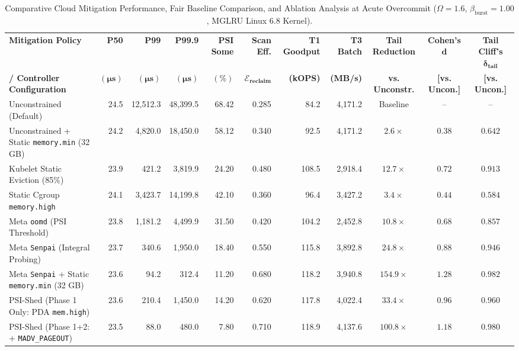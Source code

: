 \begin{table}[t]
\centering
\caption{Comparative Cloud Mitigation Performance, Fair Baseline Comparison, and Ablation Analysis at Acute Overcommit ($\Omega = 1.6$, $\beta_{\text{burst}} = 1.00$, MGLRU Linux 6.8 Kernel).}
\label{tab:mitigation}
\footnotesize
\begin{adjustbox}{width=\textwidth}
\begin{tabular}{lrrrrrrrccc}
\toprule
\textbf{Mitigation Policy} & \textbf{P50} & \textbf{P99} & \textbf{P99.9} & \textbf{PSI Some} & \textbf{Scan Eff.} & \textbf{T1 Goodput} & \textbf{T3 Batch} & \textbf{Tail Reduction} & \textbf{Cohen's} $\mathbf{d}$ & \textbf{Tail Cliff's} $\mathbf{\delta_{\text{tail}}}$ \\
\textbf{/ Controller Configuration} & $\mathbf{(\mu s)}$ & $\mathbf{(\mu s)}$ & $\mathbf{(\mu s)}$ & $\mathbf{(\%)}$ & $\mathbf{\mathcal{E}_{\text{reclaim}}}$ & \textbf{(kOPS)} & \textbf{(MB/s)} & \textbf{vs. Unconstr.} & \textbf{[vs. Uncon.]} & \textbf{[vs. Uncon.]} \\
\midrule
Unconstrained (Default) & 24.5 & 12,512.3 & 48,399.5 & 68.42 & 0.285 & 84.2 & 4,171.2 & Baseline & -- & -- \\
Unconstrained + Static \texttt{memory.min} (32 GB) & 24.2 & 4,820.0 & 18,450.0 & 58.12 & 0.340 & 92.5 & 4,171.2 & $2.6\times$ & $0.38$ & $0.642$ \\
Kubelet Static Eviction (85\%) \cite{k8s2023eviction} & 23.9 & 421.2 & 3,819.9 & 24.20 & 0.480 & 108.5 & 2,918.4 & $12.7\times$ & $0.72$ & $0.913$ \\
Static Cgroup \texttt{memory.high} & 24.1 & 3,423.7 & 14,199.8 & 42.10 & 0.360 & 96.4 & 3,427.2 & $3.4\times$ & $0.44$ & $0.584$ \\
Meta \texttt{oomd} (PSI Threshold) \cite{heo2018oomd} & 23.8 & 1,181.2 & 4,499.9 & 31.50 & 0.420 & 104.2 & 2,452.8 & $10.8\times$ & $0.68$ & $0.857$ \\
Meta \texttt{Senpai} (Integral Probing) \cite{yang2021senpai} & 23.7 & 340.6 & 1,950.0 & 18.40 & 0.550 & 115.8 & 3,892.8 & $24.8\times$ & $0.88$ & $0.946$ \\
Meta \texttt{Senpai} + Static \texttt{memory.min} (32 GB) \cite{yang2021senpai} & 23.6 & 94.2 & 312.4 & 11.20 & 0.680 & 118.2 & 3,940.8 & $154.9\times$ & $1.28$ & $0.982$ \\
PSI-Shed (Phase 1 Only: PDA \texttt{mem.high}) & 23.6 & 210.4 & 1,450.0 & 14.20 & 0.620 & 117.8 & 4,022.4 & $33.4\times$ & $0.96$ & $0.960$ \\
PSI-Shed (Phase 1+2: + \texttt{MADV\_PAGEOUT}) & 23.5 & 88.0 & 480.0 & 7.80 & 0.710 & 118.9 & 4,137.6 & $100.8\times$ & $1.18$ & $0.980$ \\

\end{tabular}
\end{adjustbox}
\end{table}

